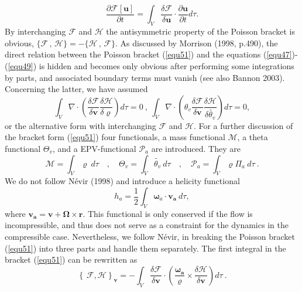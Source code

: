 \begin{equation}
\frac{\partial\mathcal{F}\left[\mathbf{u}\right]} {\partial t}=\int_V
\frac{\delta \mathcal{F}}{\delta \mathbf{u}} \cdot \frac{\partial \mathbf{u}}{\partial t}
d \tau  . \label{equ54}
\end{equation}
By interchanging $\mathcal{F}$ and $\mathcal{H}$ the antisymmetric property of the Poisson bracket is obvious,
$\lbrace \mathcal{F} \,, \,\mathcal{H} \rbrace =-\lbrace \mathcal{H} \,, \,\mathcal{F}\rbrace$. As discussed by Morrison (1998, p.490), the direct relation between the Poisson bracket (\ref{equ51}) and the equations (\ref{equ47})-(\ref{equ49}) is hidden and becomes only obvious after performing some integrations by parts, and associated boundary terms must vanish (see also Bannon 2003). Concerning the latter, we have assumed
\begin{equation}
\int_V \nabla \cdot \left( \frac{\delta \mathcal{F}}{\delta \mathbf{v}} 
\frac{\delta \mathcal{H}}{\delta \varrho}\right) d\tau =0 \:,\:
\int_V \nabla \cdot \left(\theta_v \frac{\delta \mathcal{F}}{\delta \mathbf{v}}
\frac{\delta \mathcal{H}}{\delta \tilde{\theta_v}}\right) d\tau=0,\label{equ56}
\end{equation} 
or the alternative form with interchanging $\mathcal{F}$ and $\mathcal{H}$.
For a further discussion of the bracket form (\ref{equ51}) four functionals, a mass functional $\mathcal{M}$, a theta functional $\Theta_v$, and a EPV-functional $\mathcal{P}_{a}$ are introduced. They are
\begin{equation}
\mathcal{M} = \int_V \varrho \:d \tau 
\quad ,\quad
\Theta_v =\int_V \tilde{\theta_v}\:d\tau 
\quad ,\quad
\mathcal{P}_a=\int_V \varrho \Pi_a \:d\tau \:. \label{MTH}
\end{equation}
We do not follow N\'evir (1998) and introduce a helicity functional 
\begin{equation}
h_a=\frac{1}{2}\int_V\boldsymbol{\omega}_a\cdot\mathbf{v_a}\:d\tau,
\end{equation}
where $\mathbf{v_a}=\mathbf{v}+\boldsymbol{\Omega}\times\mathbf{r}$. This functional is only conserved if the flow is incompressible, and thus does not serve
as a constraint for the dynamics in the compressible case. Nevertheless, we follow
N\'evir, in breaking the Poisson bracket (\ref{equ51}) into three parts and handle them separately. The first integral in the bracket (\ref{equ51}) can be 
rewritten as
\begin{equation}
\left\lbrace \ \mathcal{F}, \mathcal{H}\right\rbrace_{\mathbf{v}}=
-\int_V  \frac{\delta \mathcal{F}}{\delta \mathbf{v}}\cdot \left(\frac{\boldsymbol{\omega_a}}{\varrho} \times \frac{\delta \mathcal{H}}{\delta \mathbf{v}} \right) d \tau \:.\label{equ62}
\end{equation} 

